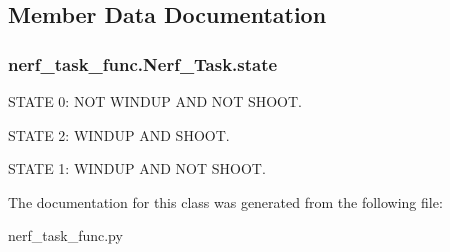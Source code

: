 \subsection{Member Data Documentation}
\subsubsection[{\texorpdfstring{state}{state}}]{\setlength{\rightskip}{0pt plus 5cm}nerf\+\_\+task\+\_\+func.\+Nerf\+\_\+\+Task.\+state}\hypertarget{classnerf__task__func_1_1Nerf__Task_aba96bf43bf05d15d36252b89611ebdd4}{}\label{classnerf__task__func_1_1Nerf__Task_aba96bf43bf05d15d36252b89611ebdd4}


S\+T\+A\+TE 0\+: N\+OT W\+I\+N\+D\+UP A\+ND N\+OT S\+H\+O\+OT. 

S\+T\+A\+TE 2\+: W\+I\+N\+D\+UP A\+ND S\+H\+O\+OT.

S\+T\+A\+TE 1\+: W\+I\+N\+D\+UP A\+ND N\+OT S\+H\+O\+OT. 

The documentation for this class was generated from the following file\+:\begin{DoxyCompactItemize}
\item 
nerf\+\_\+task\+\_\+func.\+py\end{DoxyCompactItemize}
